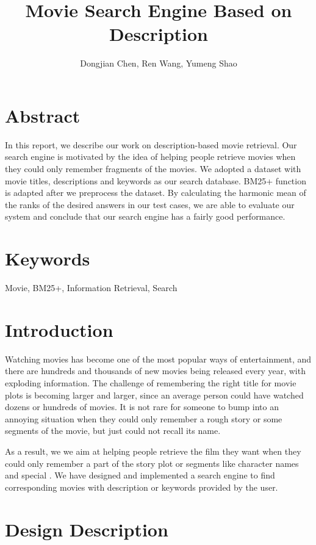 \documentclass[letterpaper,10pt]{article}
\title{Movie Search Engine Based on Description}
\author{Dongjian Chen, Ren Wang, Yumeng Shao}
\begin{document}
\maketitle

\begin{multicols}{2}
    \section*{Abstract}
     In this report, we describe our work on description-based movie retrieval. Our search engine is motivated by the idea of helping people retrieve movies when they could only remember fragments of the movies. We adopted a dataset with movie titles, descriptions and keywords as our search database. BM25+ function is adapted after we preprocess the dataset. By calculating the harmonic mean of the ranks of the desired answers in our test cases, we are able to evaluate our system and conclude that our search engine has a fairly good performance. 
     
    \section*{Keywords}

    Movie, BM25+, Information Retrieval, Search

    \vfill\null
    \columnbreak


    \section{Introduction}
    Watching movies has become one of the most popular ways of entertainment, and there are hundreds and thousands of new movies being released every year, with exploding information. The challenge of remembering the right title for movie plots is becoming larger and larger, since an average person could have watched dozens or hundreds of movies. It is not rare for someone to bump into an annoying situation when they could only remember a rough story or some segments of the movie, but just could not recall its name.

    As a result, we we aim at helping people retrieve the film they want when they could only remember a part of the story plot or segments like character names and special . We have designed and implemented a search engine to find corresponding movies with description or keywords provided by the user.

    \section{Design Description}


\end{multicols}
\end{document}
